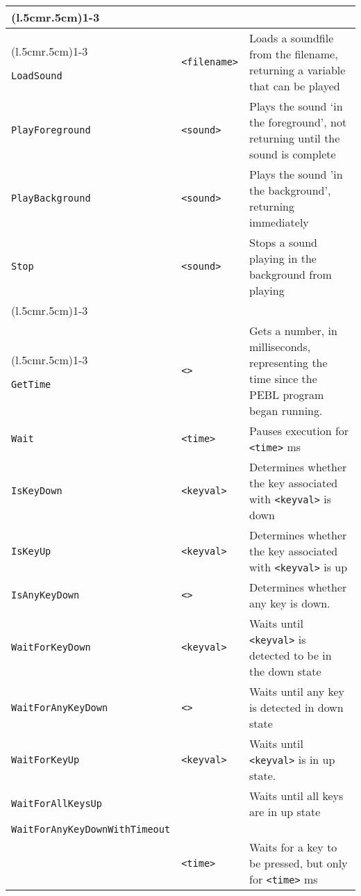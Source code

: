 \begin{longtable}{p{3cm}p{3cm}p{6cm}}
\addlinespace[0.2cm] 
\cmidrule(l{.5cm}r{.5cm}){1-3} 
\multicolumn{3}{c}{\textbf{Sound Objects Functions}}\\ 
\cmidrule(l{.5cm}r{.5cm}){1-3} 

\verb+LoadSound+ &\verb+<filename>+ &Loads a soundfile from the filename, returning a variable that can be played\\ 
\verb+PlayForeground+ &\verb+<sound>+ &Plays the sound `in the foreground', not returning until the sound is complete\\ 
\verb+PlayBackground+ &\verb+<sound>+ &Plays the sound 'in the background', returning immediately\\ 
\verb+Stop+ &\verb+<sound>+ &Stops a sound playing in the background from playing\\ 


\addlinespace[0.2cm] 

\cmidrule(l{.5cm}r{.5cm}){1-3} 
\multicolumn{3}{c}{\textbf{Misc Event Functions}}\\ 
\cmidrule(l{.5cm}r{.5cm}){1-3} 


\verb+GetTime+ &\verb+<>+ &Gets a number, in milliseconds, representing the time since the PEBL program began running.\\ 
\verb+Wait+ &\verb+<time>+ &Pauses execution for \verb+<time>+ ms \\ 
\verb+IsKeyDown+ &\verb+<keyval>+ &Determines whether the key associated with \verb+<keyval>+ is down \\ 
\verb+IsKeyUp+ &\verb+<keyval>+ &Determines whether the key associated with \verb+<keyval>+ is up\\ 
\verb+IsAnyKeyDown+ &\verb+<>+ &Determines whether any key is down.\\ 
\verb+WaitForKeyDown+ & \verb+<keyval>+ &Waits until \verb+<keyval>+ is detected to be in the down state\\ 
\verb+WaitForAnyKeyDown+ &\hspace{0.5cm} \verb+<>+ &Waits until any key is detected in down state\\ 
\verb+WaitForKeyUp+ &\verb+<keyval>+ &Waits until \verb+<keyval>+ is in up state.\\ 
\verb+WaitForAllKeysUp+ & &Waits until all keys are in up state\\ 
\verb+WaitForAnyKeyDownWithTimeout+ & & \\ 
& \verb+<time>+ & Waits for a key to be pressed, but only for \verb+<time>+ ms\\ 


\end{longtable}
